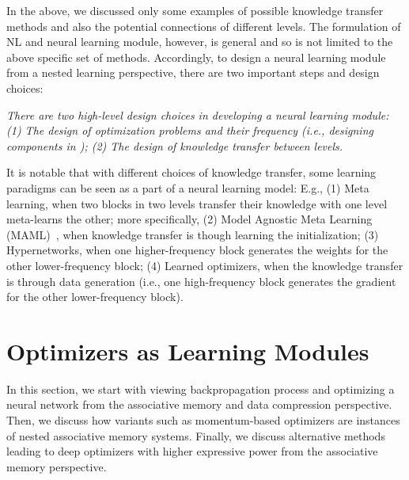In the above, we discussed only some examples of possible knowledge transfer methods and also the potential connections of different levels. The formulation of NL and neural learning module, however, is general and so is not limited to the above specific set of methods. Accordingly, to design a neural learning module from a nested learning perspective, there are two important steps and design choices:


\begin{myboxi}
    \textit{There are two high-level design choices in developing a neural learning module: (1) The design of optimization problems and their frequency (i.e., designing components in \nsam); (2) The design of knowledge transfer between levels.}
\end{myboxi}
It is notable that with different choices of knowledge transfer, some learning paradigms can be seen as a part of a neural learning model: E.g., (1) Meta learning, when two blocks in two levels transfer their knowledge with one level meta-learns the other; more specifically, (2) Model Agnostic Meta Learning (MAML)~\citep{finn2017model}, when knowledge transfer is though learning the initialization; (3) Hypernetworks, when one higher-frequency block generates the weights for the other lower-frequency block; (4) Learned optimizers, when the knowledge transfer is through data generation (i.e., one high-frequency block generates the gradient for the other lower-frequency block).




\section{Optimizers as Learning Modules}\label{sec:DeepOptimizers}
In this section, we start with viewing backpropagation process and optimizing a neural network from the associative memory and data compression perspective. Then, we discuss how variants such as momentum-based optimizers are instances of nested associative memory systems. Finally, we discuss alternative methods leading to deep optimizers with higher expressive power from the associative memory perspective. 



